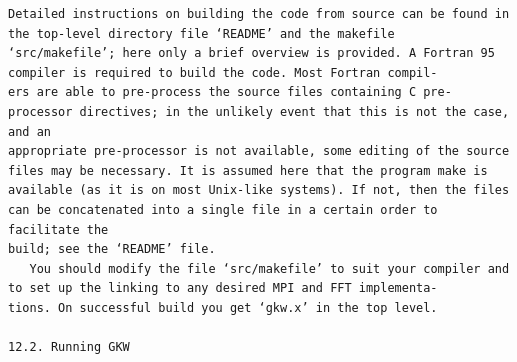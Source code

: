\documentclass[a4paper]{article}
\newcommand{\gkwpagefont}{\fontsize{6.0pt}{7.55pt}\selectfont}
\begin{document}
\begin{Verbatim}[fontsize=\gkwpagefont]
   Detailed instructions on building the code from source can be found in the top-level directory file ‘README’ and the makefile
‘src/makefile’; here only a brief overview is provided. A Fortran 95 compiler is required to build the code. Most Fortran compil-
ers are able to pre-process the source files containing C pre-processor directives; in the unlikely event that this is not the case, and an
appropriate pre-processor is not available, some editing of the source files may be necessary. It is assumed here that the program make is
available (as it is on most Unix-like systems). If not, then the files can be concatenated into a single file in a certain order to facilitate the
build; see the ‘README’ file.
   You should modify the file ‘src/makefile’ to suit your compiler and to set up the linking to any desired MPI and FFT implementa-
tions. On successful build you get ‘gkw.x’ in the top level.

12.2. Running GKW


\end{Verbatim}
\end{document}
